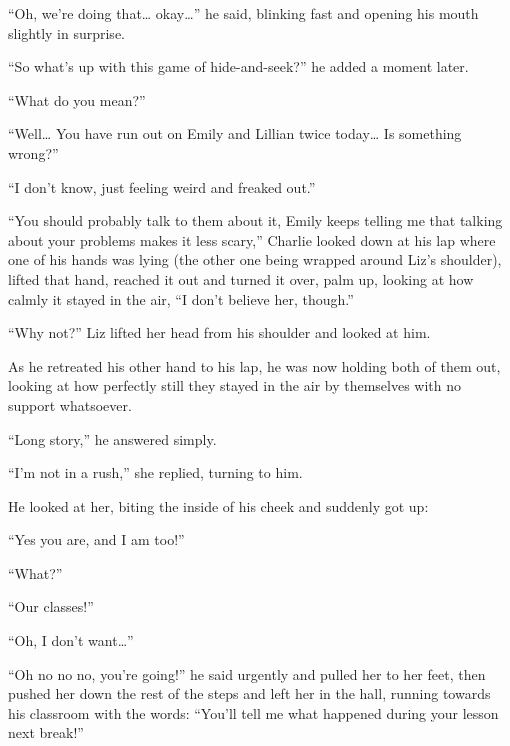 “Oh, we're doing that… okay…” he said, blinking fast and opening his mouth slightly in surprise.

“So what's up with this game of hide-and-seek?” he added a moment later.

“What do you mean?”

“Well… You have run out on Emily and Lillian twice today… Is something wrong?”

“I don't know, just feeling weird and freaked out.”

“You should probably talk to them about it, Emily keeps telling me that talking about your problems makes it less scary,” Charlie looked down at his lap where one of his hands was lying (the other one being wrapped around Liz's shoulder), lifted that hand, reached it out and turned it over, palm up, looking at how calmly it stayed in the air, “I don't believe her, though.”

“Why not?” Liz lifted her head from his shoulder and looked at him.

As he retreated his other hand to his lap, he was now holding both of them out, looking at how perfectly still they stayed in the air by themselves with no support whatsoever.

“Long story,” he answered simply.

“I'm not in a rush,” she replied, turning to him.

He looked at her, biting the inside of his cheek and suddenly got up:

“Yes you are, and I am too!”

“What?”

“Our classes!”

“Oh, I don't want…”

“Oh no no no, you're going!” he said urgently and pulled her to her feet, then pushed her down the rest of the steps and left her in the hall, running towards his classroom with the words: “You'll tell me what happened during your lesson next break!”